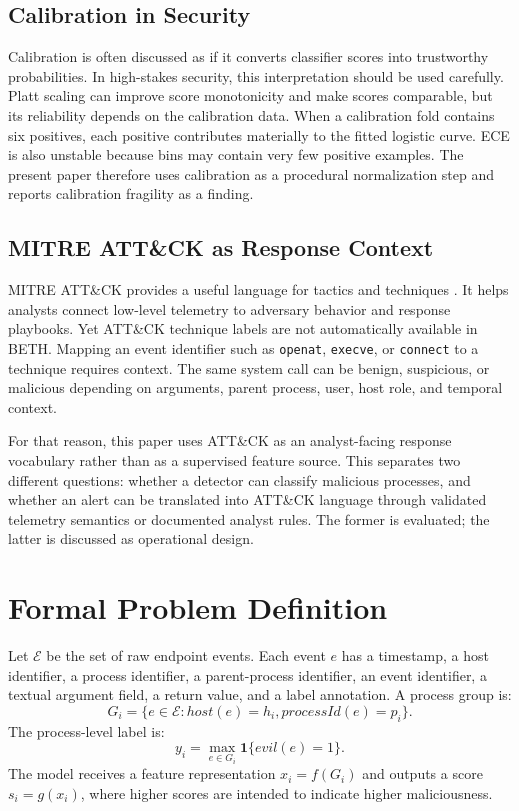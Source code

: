 \documentclass[journal]{IEEEtran}
\begin{document}
\subsection{Calibration in Security}

Calibration is often discussed as if it converts classifier scores into trustworthy probabilities. In high-stakes security, this interpretation should be used carefully. Platt scaling can improve score monotonicity and make scores comparable, but its reliability depends on the calibration data. When a calibration fold contains six positives, each positive contributes materially to the fitted logistic curve. ECE is also unstable because bins may contain very few positive examples. The present paper therefore uses calibration as a procedural normalization step and reports calibration fragility as a finding.

\subsection{MITRE ATT\&CK as Response Context}

MITRE ATT\&CK provides a useful language for tactics and techniques \cite{mitre2023,strom2018}. It helps analysts connect low-level telemetry to adversary behavior and response playbooks. Yet ATT\&CK technique labels are not automatically available in BETH. Mapping an event identifier such as \texttt{openat}, \texttt{execve}, or \texttt{connect} to a technique requires context. The same system call can be benign, suspicious, or malicious depending on arguments, parent process, user, host role, and temporal context.

For that reason, this paper uses ATT\&CK as an analyst-facing response vocabulary rather than as a supervised feature source. This separates two different questions: whether a detector can classify malicious processes, and whether an alert can be translated into ATT\&CK language through validated telemetry semantics or documented analyst rules. The former is evaluated; the latter is discussed as operational design.

\section{Formal Problem Definition}
\label{sec:formal}

Let $\mathcal{E}$ be the set of raw endpoint events. Each event $e$ has a timestamp, a host identifier, a process identifier, a parent-process identifier, an event identifier, a textual argument field, a return value, and a label annotation. A process group is:
\[
G_i = \{e \in \mathcal{E}: host(e)=h_i, processId(e)=p_i\}.
\]
The process-level label is:
\[
y_i = \max_{e\in G_i}\mathbf{1}\{evil(e)=1\}.
\]
The model receives a feature representation $x_i=f(G_i)$ and outputs a score $s_i=g(x_i)$, where higher scores are intended to indicate higher maliciousness.
\end{document}
